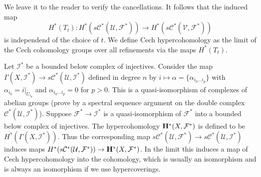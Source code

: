 We leave it to the reader to verify the cancellations.
It follows that the induced map
$$
H^*(T_t) :
H^*(s{\mathcal C}^*({\mathcal U}, {\mathcal F}^*)) \to
H^*(s{\mathcal C}^*({\mathcal V}, {\mathcal F}^*))
$$
is independend of the choice of $t$. We define
Cech hypercohomology as the limit of the Cech cohomology groups
over all refinements via the maps $H^*(T_t)$.

\medskip\noindent
Let ${\mathcal I}^*$ be a bounded below complex of injectives. Consider
the map $\Gamma(X, {\mathcal I}^*) \to
s{\mathcal C}^*({\mathcal U}, {\mathcal I}^*)$ defined in degree $n$ by
$i \mapsto \alpha = \{\alpha_{i_0\ldots i_p}\}$ with
$\alpha_{i_0} = i|_{U_{i_0}}$ and $\alpha_{i_0\ldots i_p} = 0$
for $p>0$. This is a quasi-isomorphism of complexes of abelian groups
(prove by a spectral sequence argument on the double complex
${\mathcal C}^*({\mathcal U}, {\mathcal I}^*)$).
Suppose ${\mathcal F}^* \to {\mathcal I}^*$ is a quasi-isomorphism
of ${\mathcal F}^*$ into a bounded below complex of injectives.
The hypercohomology ${\bf H}^*(X, {\mathcal F}^*)$ is defined
to be $H^*(\Gamma(X, {\mathcal I}^*))$. Thus
the corresponding map $s{\mathcal C}^*({\mathcal U}, {\mathcal F}^*) \to
s{\mathcal C}^*({\mathcal U}, {\mathcal I}^*)$ induces maps
$H^*(s{\mathcal C}^*({\mathcal U}, {\mathcal F}^*)) \to
{\bf H}^*(X, {\mathcal F}^*)$.
In the limit this induces a map of Cech hypercohomology into
the cohomology, which is usually an isomorphism and is always
an isomorphism if we use hypercoverings.

